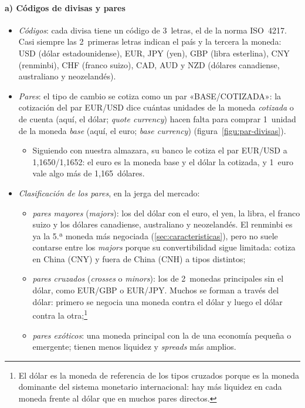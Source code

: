 \documentclass[11pt]{article}
\begin{document}
\paragraph{a) Códigos de divisas y pares}

\begin{itemize}
\item \emph{Códigos}: cada divisa tiene un código de 3~letras, el de la norma ISO~4217. Casi siempre las 2~primeras letras indican el país y la tercera la moneda: USD (dólar estadounidense), EUR, JPY (yen), GBP (libra esterlina), CNY (renminbi), CHF (franco suizo), CAD, AUD y NZD (dólares canadiense, australiano y neozelandés).
\item \emph{Pares}: el tipo de cambio se cotiza como un par «BASE/COTIZADA»: la cotización del par EUR/USD dice cuántas unidades de la moneda \emph{cotizada} o de cuenta (aquí, el dólar; \emph{quote currency}) hacen falta para comprar 1~unidad de la moneda \emph{base} (aquí, el euro; \emph{base currency}) (figura~\ref{figu:par-divisas}).
  \begin{itemize}
  \item Siguiendo con nuestra almazara, su banco le cotiza el par EUR/USD a 1,1650/1,1652: el euro es la moneda base y el dólar la cotizada, y 1~euro vale algo más de 1,165~dólares.
  \end{itemize}
\item \emph{Clasificación de los pares}, en la jerga del mercado:
  \begin{itemize}
  \item \emph{pares mayores} (\emph{majors}): los del dólar con el euro, el yen, la libra, el franco suizo y los dólares canadiense, australiano y neozelandés. El renminbi es ya la 5.ª moneda más negociada (\ref{sec:caracteristicas}), pero no suele contarse entre los \emph{majors} porque su convertibilidad sigue limitada: cotiza en China (CNY) y fuera de China (CNH) a tipos distintos;
  \item \emph{pares cruzados} (\emph{crosses} o \emph{minors}): los de 2~monedas principales sin el dólar, como EUR/GBP o EUR/JPY. Muchos se forman a través del dólar: primero se negocia una moneda contra el dólar y luego el dólar contra la otra;\footnote{El dólar es la moneda de referencia de los tipos cruzados porque es la moneda dominante del sistema monetario internacional: hay más liquidez en cada moneda frente al dólar que en muchos pares directos.}
  \item \emph{pares exóticos}: una moneda principal con la de una economía pequeña o emergente; tienen menos liquidez y \emph{spreads} más amplios.
  \end{itemize}
\end{itemize}
\end{document}
